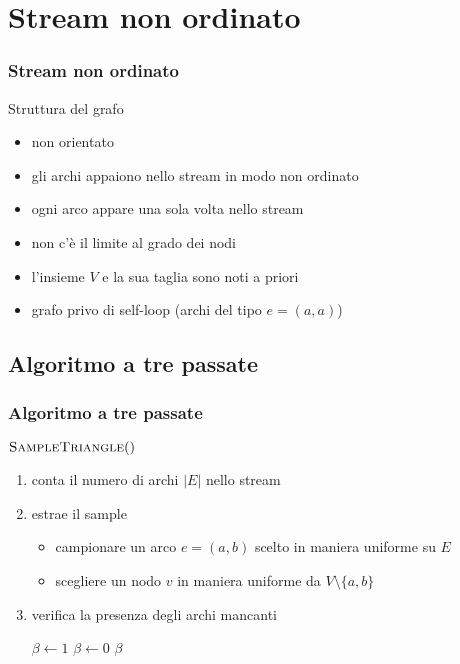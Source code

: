 \documentclass{beamer}
\begin{document}
\section{Stream non ordinato}

\begin{frame}
\frametitle{Stream non ordinato}
Struttura del grafo
\begin{itemize}
    \item non orientato
    \item gli archi appaiono nello stream in modo non ordinato
    \item ogni arco appare una sola volta nello stream
    \item non c’è il limite al grado dei nodi
    \item l’insieme $V$ e la sua taglia sono noti a priori
    \item grafo privo di self-loop (archi del tipo $e=(a,a)$)
\end{itemize}

\end{frame}

\subsection{Algoritmo a tre passate}

\begin{frame}
\frametitle{Algoritmo a tre passate}

$\Call{SampleTriangle}{ }$
\begin{enumerate}
    \item conta il numero di archi $|E|$ nello stream
    \item estrae il sample
        \begin{itemize}
            \item campionare un arco $e=(a,b)$ scelto in maniera uniforme su $E$
            \item scegliere un nodo $v$ in maniera uniforme da $V \setminus \{a,b\}$
        \end{itemize}
    \item 
        verifica la presenza degli archi mancanti
        \begin{algorithmic}
                \State $\beta \gets 1$
            \Else
                \State $\beta \gets 0$
            \EndIf
            \Return $\beta$
        \end{algorithmic}
\end{enumerate}

\end{frame}
\end{document}
